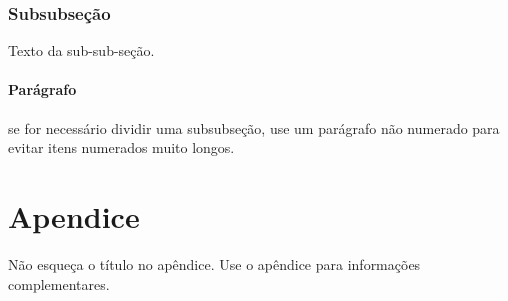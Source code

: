 \documentclass[a4paper,11pt,final]{article}
\begin{document}
\subsubsection{Subsubseção}
Texto da sub-sub-seção.

\paragraph{Parágrafo} se for necessário dividir uma subsubseção, use um parágrafo não numerado para evitar itens numerados muito longos.


\appendix
\section{Apendice}
Não esqueça o título no apêndice. Use o apêndice para informações complementares.



\end{document}
